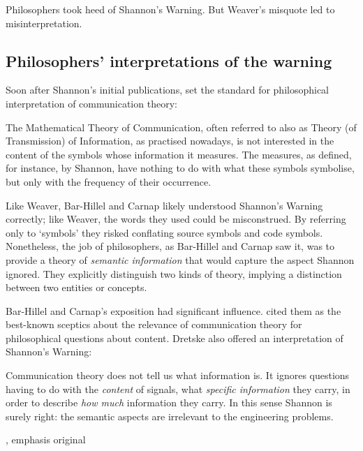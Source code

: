 \documentclass[12pt]{article}
\begin{document}
Philosophers took heed of {\sc Shannon's Warning}.
But Weaver's misquote led to misinterpretation.

\subsection{Philosophers' interpretations of the warning}\label{subsec:warningPhil}

Soon after Shannon's initial publications, \citet{bar-hillel1953semantic} set the standard for philosophical interpretation of communication theory:

\begin{myquote}
The Mathematical Theory of Communication, often referred to also as Theory (of Transmission) of Information, as practised nowadays, is not interested in the content of the symbols whose information it measures. The measures, as defined, for instance, by Shannon, have nothing to do with what these symbols symbolise, but only with the frequency of their occurrence.
\par\hspace*{\fill}\citet[147]{bar-hillel1953semantic}
\end{myquote}

\noindent Like Weaver, Bar-Hillel and Carnap likely understood {\sc Shannon's Warning} correctly; like Weaver, the words they used could be misconstrued.
By referring only to `symbols' they risked conflating source symbols and code symbols.
Nonetheless, the job of philosophers, as Bar-Hillel and Carnap saw it, was to provide a theory of \textit{semantic information} that would capture the aspect Shannon ignored.
They explicitly distinguish two kinds of theory, implying a distinction between two entities or concepts.

Bar-Hillel and Carnap's exposition had significant influence.
\citet[p. 241, n.
1]{dretske1981knowledge} cited them as the best-known sceptics about the relevance of communication theory for philosophical questions about content.
Dretske also offered an interpretation of {\sc Shannon's Warning}:

\begin{myquote}
Communication theory does not tell us what information is.
It ignores questions having to do with the \emph{content} of signals, what \emph{specific information} they carry, in order to describe \emph{how much} information they carry.
In this sense Shannon is surely right: the semantic aspects are irrelevant to the engineering problems.
\par\hspace*{\fill}\citet[41]{dretske1981knowledge}, emphasis original
\end{myquote}
\end{document}
